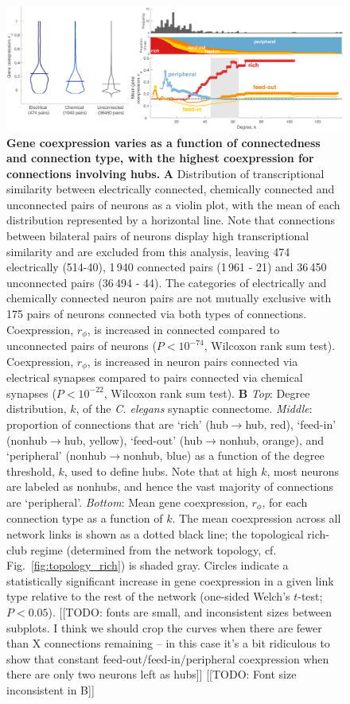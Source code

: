 \documentclass[10pt,letterpaper]{article}
\begin{document}
 \begin{figure}[h]
 \centering
    \includegraphics[width=1\textwidth]{MeanCoexpressionALL.pdf}
 \caption{{\bf Gene coexpression varies as a function of connectedness and connection type, with the highest coexpression for connections involving hubs.}
\textbf{A} Distribution of transcriptional similarity between electrically connected, chemically connected and unconnected pairs of neurons as a violin plot, with the mean of each distribution represented by a horizontal line.
Note that connections between bilateral pairs of neurons display high transcriptional similarity and are excluded from this analysis, leaving 474 electrically (514-40), 1\,940 connected pairs (1\,961 - 21) and 36\,450 unconnected pairs (36\,494 - 44).
The categories of electrically and chemically connected neuron pairs are not mutually exclusive with 175 pairs of neurons connected via both types of connections. 
Coexpression, $r_\phi$, is increased in connected compared to unconnected pairs of neurons ($P < 10^{-74}$, Wilcoxon rank sum test).
Coexpression, $r_\phi$, is increased in neuron pairs connected via electrical synapses compared to pairs connected via chemical synapses ($P < 10^{-22}$, Wilcoxon rank sum test).
\textbf{B}
\emph{Top}: Degree distribution, $k$, of the \emph{C. elegans} synaptic connectome.
\emph{Middle}: proportion of connections that are `rich' (hub$\rightarrow$hub, red), `feed-in' (nonhub$\rightarrow$hub, yellow), `feed-out' (hub$\rightarrow$nonhub, orange), and `peripheral' (nonhub$\rightarrow$nonhub, blue) as a function of the degree threshold, $k$, used to define hubs.
Note that at high $k$, most neurons are labeled as nonhubs, and hence the vast majority of connections are `peripheral'.
\emph{Bottom}: Mean gene coexpression, $r_\phi$, for each connection type as a function of $k$.
The mean coexpression across all network links is shown as a dotted black line; the topological rich-club regime (determined from the network topology, cf. Fig.~\ref{fig:topology_rich}) is shaded gray.
Circles indicate a statistically significant increase in gene coexpression in a given link type relative to the rest of the network (one-sided Welch's $t$-test; $P < 0.05$).
[[TODO: fonts are small, and inconsistent sizes between subplots.
I think we should crop the curves when there are fewer than X connections remaining -- in this case it's a bit ridiculous to show that constant feed-out/feed-in/peripheral coexpression when there are only two neurons
left as hubs]]
[[TODO: Font size inconsistent in B]]
}
 \label{fig:coExp}
\end{figure}
\end{document}
